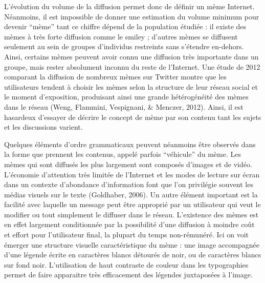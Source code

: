 L{\textquoteright}\'evolution du volume de la diffusion permet donc de d\'efinir un m\`eme Internet. N\'eanmoins, il est impossible de donner une estimation du volume minimum pour devenir {\textquotedblleft}m\`eme{\textquotedblright} tant ce chiffre d\'epend de la population \'etudi\'ee : il existe des m\`emes \`a tr\`es forte diffusion comme le smiley ; d{\textquoteright}autres m\`emes se diffusent seulement au sein de groupes d{\textquoteright}individus restreints sans s{\textquoteright}\'etendre en-dehors. Ainsi, certains m\`emes peuvent avoir connu une diffusion tr\`es importante dans un groupe, mais rester absolument inconnu du reste de l{\textquoteright}Internet. Une \'etude de 2012 comparant la diffusion de nombreux m\`emes sur Twitter montre que les utilisateurs tendent \`a choisir les m\`emes selon la structure de leur r\'eseau social et le moment d{\textquoteright}exposition, produisant ainsi une grande h\'et\'erog\'en\'eit\'e des m\`emes dans le r\'eseau (Weng, Flammini, Vespignani, \& Menczer, 2012). Ainsi, il est hasardeux d{\textquoteright}essayer de d\'ecrire le concept de m\`eme par son contenu tant les sujets et les discussions varient. 

Quelques \'el\'ements d{\textquoteright}ordre grammaticaux peuvent n\'eanmoins \^etre observ\'es dans la forme que prennent les contenus, appel\'e parfois {\textquotedblleft}v\'ehicule{\textquotedblright} du m\`eme. Les m\`emes qui sont diffus\'es les plus largement sont compos\'es d{\textquoteright}images et de vid\'eo. L{\textquoteright}\'economie d{\textquoteright}attention tr\`es limit\'ee de l{\textquoteright}Internet et les modes de lecture sur \'ecran dans un contexte d{\textquoteright}abondance d{\textquoteright}information font que l{\textquoteright}on privil\'egie souvent les m\'edias visuels sur le texte (Goldhaber, 2006). Un autre \'el\'ement important est la facilit\'e avec laquelle un message peut \^etre appropri\'e par un utilisateur qui veut le modifier ou tout simplement le diffuser dans le r\'eseau. L{\textquoteright}existence des m\`emes est en effet largement conditionn\'ee par la possibilit\'e d{\textquoteright}une diffusion \`a moindre co\^ut et effort pour l{\textquoteright}utilisateur final, la plupart du temps non-r\'emun\'er\'e. Ici on voit \'emerger une structure visuelle caract\'eristique du m\`eme : une image accompagn\'ee d{\textquoteright}une l\'egende \'ecrite en caract\`eres blancs d\'etour\'es de noir, ou de caract\`eres blancs sur fond noir. L{\textquoteright}utilisation de haut contraste de couleur dans les typographies permet de faire apparaitre tr\`es efficacement des l\'egendes juxtapos\'ees \`a l{\textquoteright}image.


